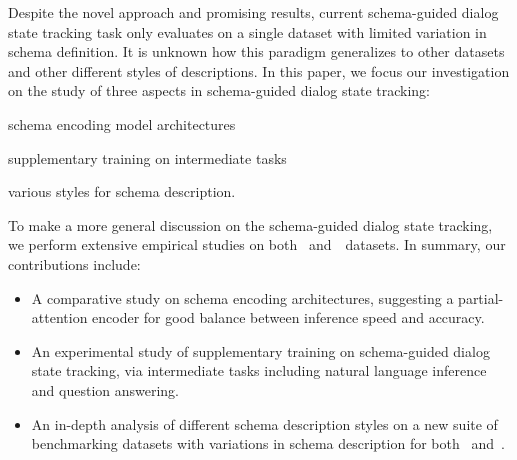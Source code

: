 Despite the novel approach and promising results, current
schema-guided dialog state tracking task only evaluates on a single
dataset with limited variation in schema definition. It is unknown how
this paradigm generalizes to other datasets and other different styles
of descriptions. In this paper, we focus our investigation on the
study of three aspects in schema-guided dialog state tracking:
\begin{inparaenum}[(1)]
\item schema encoding model architectures
\item supplementary training on intermediate tasks
\item various styles for schema description.
\end{inparaenum}
To make a more general discussion on
the schema-guided dialog state tracking, we perform extensive
empirical studies on both \sgdst~and~\multiwoz~datasets. In summary,
our contributions include:
\begin{itemize}
\item A comparative study
  on schema encoding architectures, suggesting a partial-attention
  encoder for good balance between inference speed and accuracy.
\item An experimental study of supplementary training on
  schema-guided dialog state tracking, via intermediate tasks
  including natural language inference and question answering.
\item An in-depth analysis of different schema description styles on a new
  suite of benchmarking datasets with
  variations in schema description for both \sgdst~and~\multiwoz.
\end{itemize}

